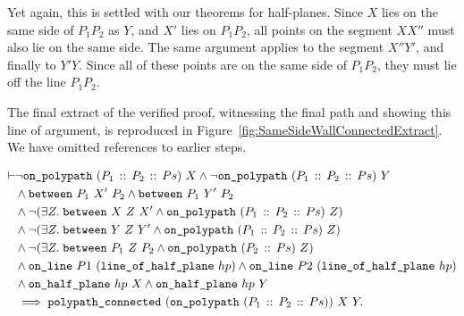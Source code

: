 Yet again, this is settled with our theorems for half-planes. Since $X$ lies on the same side of $P_1P_2$ as $Y$, and $X'$ lies on $P_1P_2$, all points on the segment $XX''$ must also lie on the same side. The same argument applies to the segment $X''Y'$, and finally to $Y'Y$. Since all of these points are on the same side of $P_1P_2$, they must lie off the line $P_1P_2$. 

The final extract of the verified proof, witnessing the final path and showing this line of argument, is reproduced in Figure~\ref{fig:SameSideWallConnectedExtract}. We have omitted references to earlier steps.

\begin{equation}
  \label{eq:SameSideWallConnected}
  \begin{split}
\vdash &\neg\texttt{on\_polypath}\ (P_1\,::\,P_2\,::\,Ps)\ X \wedge\neg\texttt{on\_polypath}\ (P_1\,::\,P_2\,::\,Ps)\ Y\\
    &\wedge\texttt{between}\ P_1\ X'\ P_2\wedge\texttt{between}\ P_1\ Y'\ P_2\\
    &\wedge\neg(\exists Z.\; \texttt{between}\ X\ Z\ X' \wedge \texttt{on\_polypath}\ (P_1\,::\,P_2\,::\,Ps)\ Z)\\
    &\wedge\neg(\exists Z.\; \texttt{between}\ Y\ Z\ Y' \wedge \texttt{on\_polypath}\ (P_1\,::\,P_2\,::\,Ps)\ Z)\\
    &\wedge\neg(\exists Z.\; \texttt{between}\ P_1\ Z\ P_2 \wedge \texttt{on\_polypath}\ (P_2\,::\,Ps)\ Z)\\
    &\wedge \texttt{on\_line}\ P1\ (\texttt{line\_of\_half\_plane}\ hp) \wedge \texttt{on\_line}\ P2\ (\texttt{line\_of\_half\_plane}\ hp)\\
    &\wedge \texttt{on\_half\_plane}\ hp\ X \wedge \texttt{on\_half\_plane}\ hp\ Y\\
    &\implies \texttt{polypath\_connected}\ (\texttt{on\_polypath}\ (P_1\,::\,P_2\,::\,Ps))\ X\ Y.
  \end{split}
\end{equation}

